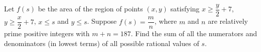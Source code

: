 Let $f(s)$ be the area of the region of points $(x,y)$ satisfying $x\ge\dfrac y2+7$, $y\ge\dfrac x2+7$, $x\le s$ and $y\le s$. Suppose $f(s)=\dfrac mn$, where $m$ and $n$ are relatively prime positive integers with $m+n=187$. Find the sum of all the numerators and denominators (in lowest terms) of all possible rational values of $s$.

